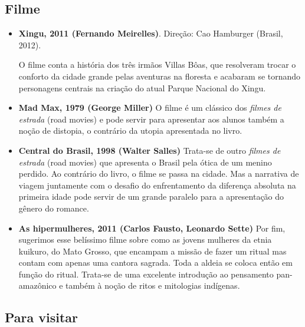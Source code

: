 \documentclass[12pt]{extarticle}
\begin{document}
\subsection{Filme}

\begin{itemize}
\item\textbf{Xingu, 2011 (Fernando Meirelles)}. Direção: Cao Hamburger (Brasil, 2012).

O filme conta a história dos três irmãos Villas Bôas, que resolveram
trocar o conforto da cidade grande pelas aventuras na floresta e
acabaram se tornando personagens centrais na criação do atual Parque
Nacional do Xingu.
\end{itemize}

\begin{itemize}
\item\textbf{Mad Max, 1979 (George Miller)}
O filme é um clássico dos \textit{filmes de estrada} (road movies) e pode 
servir para apresentar aos alunos também a noção de distopia, o contrário 
da utopia apresentada no livro. 
\end{itemize}

\begin{itemize}
\item\textbf{Central do Brasil, 1998 (Walter Salles)}
Trata-se de outro \textit{filmes de estrada} (road movies) que apresenta
o Brasil pela ótica de um menino perdido. Ao contrário do livro, o filme 
se passa na cidade. Mas a narrativa de viagem juntamente com o desafio 
do enfrentamento da diferença absoluta na primeira idade pode servir 
de um grande paralelo para a apresentação do gênero do romance. 
\end{itemize}

\begin{itemize}
\item\textbf{As hipermulheres, 2011 (Carlos Fausto, Leonardo Sette)}
Por fim, sugerimos esse belíssimo filme sobre como as jovens mulheres da etnia 
kuikuro, do Mato Grosso, que encampam a missão de fazer um ritual mas contam 
com apenas uma cantora sagrada. Toda a aldeia se coloca então em função do 
ritual. Trata-se de uma excelente introdução ao pensamento pan-amazônico e
também à noção de ritos e mitologias indígenas. 
\end{itemize}


\subsection{Para visitar}
\end{document}

